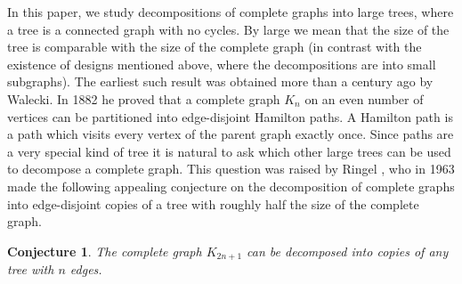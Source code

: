 \documentclass{article}
\newtheorem{conjecture}[lemma]{Conjecture}
\theoremstyle{definition}
\begin{document}
In this paper, we study decompositions of complete graphs into large trees, where a tree is a connected graph with no cycles. By large we mean that the size of the tree is comparable with the size of the complete graph (in contrast with the existence of designs mentioned above, where the decompositions are into small subgraphs).
The earliest such result  was obtained more than a century ago by Walecki. In 1882 he proved that a complete graph $K_n$ on an even number of vertices can be partitioned into edge-disjoint Hamilton paths.
A Hamilton path is a path which visits every vertex of the parent graph exactly once. Since paths are a very special kind of tree it is natural to ask which other large trees can be used to decompose a complete graph. This question was raised by Ringel \cite{ringel1963theory}, who in 1963 made the following
appealing conjecture on the decomposition of complete graphs into edge-disjoint copies of a tree with roughly half the size of the complete graph.

\begin{conjecture} \label{ringelconj}
The complete graph $K_{2n+1}$ can be decomposed into copies of any tree with $n$ edges.
\end{conjecture}
\end{document}
